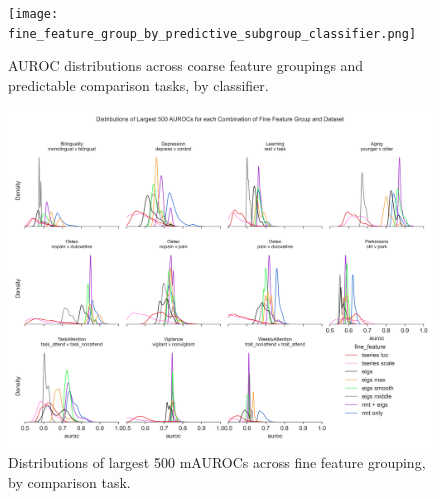 \documentclass{article}  %
\begin{document}
\begin{spacing}{1}
\begin{figure}
\begin{center}
\texttt{[image: fine\_feature\_group\_by\_predictive\_subgroup\_classifier.png]}
\end{center}
\caption
{ \label{fig:fine-classifier}
AUROC distributions across coarse feature groupings and predictable comparison tasks, by classifier.}
\end{figure}



\begin{figure}
\begin{center}
\includegraphics[width=\textwidth,height=0.9\textheight,keepaspectratio]{fine_feature_largest_by_subgroup.png}
\end{center}
\caption
{ \label{fig:fine-largest}
Distributions of largest 500 mAUROCs across fine feature grouping, by comparison task.}
\end{figure}




\end{spacing}
\end{document}
